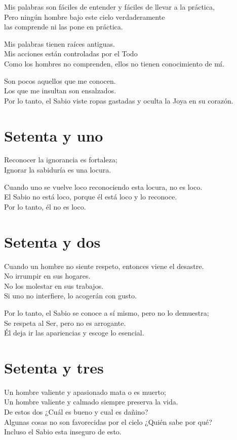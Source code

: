 \documentclass[book,b5paper,hidelinks,final]{memoir}
\begin{document}
	Mis palabras son fáciles de entender y fáciles de llevar a la
	práctica,\\
	Pero ningún hombre bajo este cielo verdaderamente\\
	las comprende ni las pone en práctica.
	
	Mis palabras tienen raíces antiguas.\\
	Mis acciones están controladas por el Todo\\
	Como los hombres no comprenden, ellos no tienen conocimiento de mí.
	
	Son pocos aquellos que me conocen.\\
	Los que me insultan son ensalzados.\\
	Por lo tanto, el Sabio viste ropas gastadas y oculta la Joya en su
	corazón.
	
	\chapter*{Setenta y uno}
	
	Reconocer la ignorancia es fortaleza;\\
	Ignorar la sabiduría es una locura.
	
	Cuando uno se vuelve loco reconociendo esta locura, no es loco.\\
	El Sabio no está loco, porque él está loco y lo reconoce.\\
	Por lo tanto, él no es loco.
	
	\chapter*{Setenta y dos}
	
	Cuando un hombre no siente respeto, entonces viene el desastre.\\
	No irrumpir en sus hogares.\\
	No los molestar en sus trabajos.\\
	Si uno no interfiere, lo acogerán con gusto.
	
	Por lo tanto, el Sabio se conoce a sí mismo, pero no lo demuestra;\\
	Se respeta al Ser, pero no es arrogante.\\
	Él deja ir las apariencias y escoge lo esencial.
	
	\chapter*{Setenta y tres}
	
	Un hombre valiente y apasionado mata o es muerto;\\
	Un hombre valiente y calmado siempre preserva la vida.\\
	De estos dos ¿Cuál es bueno y cual es dañino?\\
	Algunas cosas no son favorecidas por el cielo ¿Quién sabe por qué?\\
	Incluso el Sabio esta inseguro de esto.
	
\end{document}
